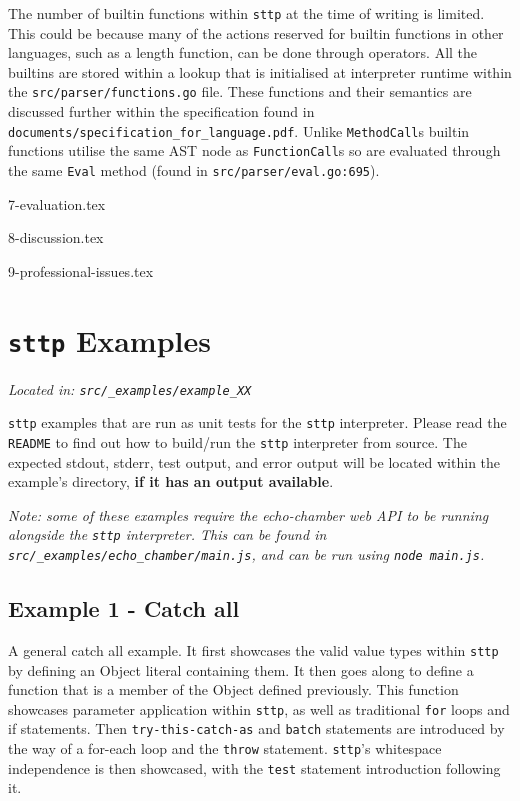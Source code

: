 \documentclass[]{full}
\theoremstyle{definition}
\begin{document}
The number of builtin functions within \verb|sttp| at the time of writing is limited. This could be because many of the actions reserved for builtin functions in other languages, such as a length function, can be done through operators. All the builtins are stored within a lookup that is initialised at interpreter runtime within the \verb|src/parser/functions.go| file. These functions and their semantics are discussed further within the specification found in \verb|documents/specification_for_language.pdf|. Unlike \verb|MethodCall|s builtin functions utilise the same AST node as \verb|FunctionCall|s so are evaluated through the same \verb|Eval| method (found in \verb|src/parser/eval.go:695|).

{7-evaluation.tex}

{8-discussion.tex}

{9-professional-issues.tex}

\appendix

\cprotect\chapter{\verb|sttp| Examples}
\label{appendix:sttp-examples}

\cprotect\textit{Located in: \verb|src/_examples/example_XX|}

\verb|sttp| examples that are run as unit tests for the \verb|sttp| interpreter. Please read the \verb|README| to find out how to build/run the \verb|sttp| interpreter from source. The expected stdout, stderr, test output, and error output will be located within the example's directory, \textbf{if it has an output available}.

\cprotect\textit{Note: some of these examples require the echo-chamber web API to be running alongside the \verb|sttp| interpreter. This can be found in \verb|src/_examples/echo_chamber/main.js|, and can be run using \verb|node main.js|.}

\section{Example 1 - Catch all}
\label{appendix:sttp-examples-1}

A general catch all example. It first showcases the valid value types within \verb|sttp| by defining an Object literal containing them. It then goes along to define a function that is a member of the Object defined previously. This function showcases parameter application within \verb|sttp|, as well as traditional \verb|for| loops and if statements. Then \verb|try-this-catch-as| and \verb|batch| statements are introduced by the way of a for-each loop and the \verb|throw| statement. \verb|sttp|'s whitespace independence is then showcased, with the \verb|test| statement introduction following it.
\end{document}
